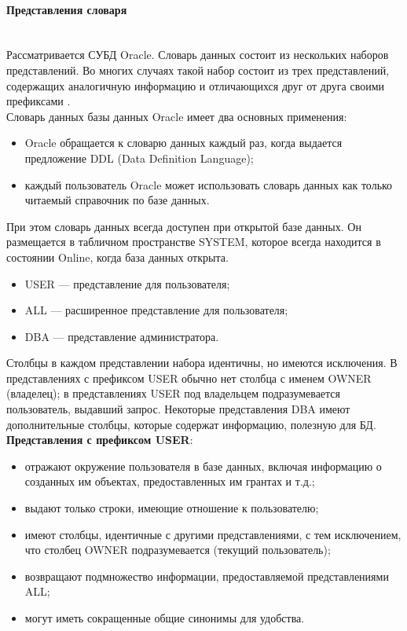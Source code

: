 \paragraph{Представления словаря} ~\\

Рассматривается СУБД Oracle. Словарь данных состоит из нескольких наборов представлений. Во многих случаях такой набор состоит из трех представлений, содержащих аналогичную информацию и отличающихся друг от друга своими префиксами \autocite{Kirillov2009}.\\

Словарь данных базы данных Oracle имеет два основных применения:

\begin{itemize}
    \item Oracle обращается к словарю данных каждый раз, когда выдается предложение DDL (Data Definition Language);
    \item каждый пользователь Oracle может использовать словарь данных как только читаемый справочник по базе данных.
\end{itemize}

При этом словарь данных всегда доступен при открытой базе данных. Он размещается в табличном пространстве SYSTEM, которое всегда находится в состоянии Online, когда база данных открыта.

\begin{itemize}
    \item USER — представление для пользователя;
    \item ALL — расширенное представление для пользователя;
    \item DBA — представление администратора.
\end{itemize}

Столбцы в каждом представлении набора идентичны, но имеются исключения. В представлениях с префиксом USER обычно нет столбца с именем OWNER (владелец); в представлениях USER под владельцем подразумевается пользователь, выдавший запрос. Некоторые представления DBA имеют дополнительные столбцы, которые содержат информацию, полезную для БД. ~\\

\textbf{Представления с префиксом USER}:
\begin{itemize}
    \item отражают окружение пользователя в базе данных, включая информацию о созданных им объектах, предоставленных им грантах и т.д.;
    \item выдают только строки, имеющие отношение к пользователю;
    \item имеют столбцы, идентичные с другими представлениями, с тем исключением, что столбец OWNER подразумевается (текущий пользователь);
    \item возвращают подмножество информации, предоставляемой представлениями ALL;
    \item могут иметь сокращенные общие синонимы для удобства.
\end{itemize}

